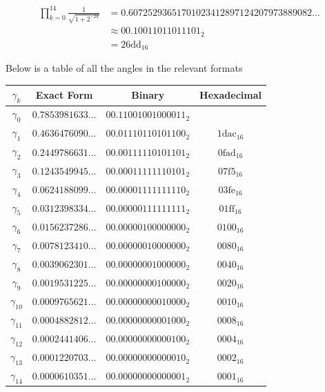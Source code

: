 {\begin{align*}
	\prod_{k=0}^{14} \frac{1}{\sqrt{1 + 2^{-2k}}} &= 
		0.60725293651701023412897124207973889082\ldots\\
		&\approx \textrm{00.10011011011101}_2\\
		&= \textrm{26dd}_{16}
\end{align*}

Below is a table of all the angles in the relevant formats

\begin{center}
\begin{tabular}{|c|c|c|c|}
	\hline
	\(\gamma_k\) & Exact Form & Binary & Hexadecimal \\\hline
	\(\gamma_0\) & \(0.7853981633\ldots\)
		& \(\textrm{00.11001001000011}_2\)
		& \(\textrm{3243}_{16}\\\hline
	\(\gamma_1\) & \(0.4636476090\ldots\)
		& \(\textrm{00.01110110101100}_2\)
		& \(\textrm{1dac}_{16}\)\\\hline
	\(\gamma_2\) & \(0.2449786631\ldots\)
		& \(\textrm{00.00111110101101}_2\)
		& \(\textrm{0fad}_{16}\)\\\hline
	\(\gamma_3\) & \(0.1243549945\ldots\)
		& \(\textrm{00.00011111110101}_2\)
		& \(\textrm{07f5}_{16}\)\\\hline
	\(\gamma_4\) & \(0.0624188099\ldots\)
		& \(\textrm{00.00001111111110}_2\)
		& \(\textrm{03fe}_{16}\)\\\hline
	\(\gamma_5\) & \(0.0312398334\ldots\)
		& \(\textrm{00.00000111111111}_2\)
		& \(\textrm{01ff}_{16}\)\\\hline
	\(\gamma_6\) & \(0.0156237286\ldots\)
		& \(\textrm{00.00000100000000}_2\)
		& \(\textrm{0100}_{16}\)\\\hline
	\(\gamma_7\) & \(0.0078123410\ldots\)
		& \(\textrm{00.00000010000000}_2\)
		& \(\textrm{0080}_{16}\)\\\hline
	\(\gamma_8\) & \(0.0039062301\ldots\)
		& \(\textrm{00.00000001000000}_2\)
		& \(\textrm{0040}_{16}\)\\\hline
	\(\gamma_9\) & \(0.0019531225\ldots\)
		& \(\textrm{00.00000000100000}_2\)
		& \(\textrm{0020}_{16}\)\\\hline
	\(\gamma_{10}\) & \(0.0009765621\ldots\)
		& \(\textrm{00.00000000010000}_2\)
		& \(\textrm{0010}_{16}\)\\\hline
	\(\gamma_{11}\) & \(0.0004882812\ldots\)
		& \(\textrm{00.00000000001000}_2\)
		& \(\textrm{0008}_{16}\)\\\hline
	\(\gamma_{12}\) & \(0.0002441406\ldots\)
		& \(\textrm{00.00000000000100}_2\)
		& \(\textrm{0004}_{16}\)\\\hline
	\(\gamma_{13}\) & \(0.0001220703\ldots\)
		& \(\textrm{00.00000000000010}_2\)
		& \(\textrm{0002}_{16}\)\\\hline
	\(\gamma_{14}\) & \(0.0000610351\ldots\)
		& \(\textrm{00.00000000000001}_2\)
		& \(\textrm{0001}_{16}\)\\\hline
\end{tabular}
\end{center}

}
